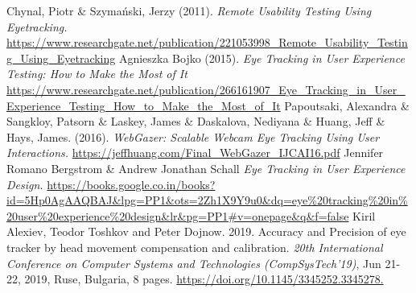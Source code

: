 \documentclass[12pt,a4paper,final]{extreport}
\begin{document}
\newpage
{}
\vspace{0.3cm}
\begin{thebibliography}{}
    Chynal, Piotr \& Szymański, Jerzy (2011). \emph{Remote Usability Testing Using Eyetracking.} 
    \newline
    \url{https://www.researchgate.net/publication/221053998_Remote_Usability_Testing_Using_Eyetracking}
    Agnieszka Bojko (2015). \emph{Eye Tracking in User Experience Testing: How to Make the Most of It }
    \newline
    \url{https://www.researchgate.net/publication/266161907_Eye_Tracking_in_User_Experience_Testing_How_to_Make_the_Most_of_It}
    Papoutsaki, Alexandra \& Sangkloy, Patsorn \& Laskey, James \& Daskalova, Nediyana \& Huang, Jeff \& Hays, James. (2016). \emph{WebGazer: Scalable Webcam Eye Tracking Using User Interactions.}
    \newline
    \url{https://jeffhuang.com/Final_WebGazer_IJCAI16.pdf}
    Jennifer Romano Bergstrom \& Andrew Jonathan Schall \emph{Eye Tracking in User Experience Design.}
    \newline
    \url{https://books.google.co.in/books?id=5Hp0AgAAQBAJ&lpg=PP1&ots=2Zh1X9Y9u0&dq=eye%20tracking%20in%20user%20experience%20design&lr&pg=PP1#v=onepage&q&f=false}
    Kiril Alexiev, Teodor Toshkov and Peter Dojnow. 2019. Accuracy and Precision of eye tracker by head movement compensation and calibration. \emph{20th International Conference on Computer Systems and Technologies
    (CompSysTech'19)}, Jun 21-22, 2019, Ruse, Bulgaria, 8 pages.
    \newline
    \url{https://doi.org/10.1145/3345252.3345278.}

\end{thebibliography}
\end{document}
